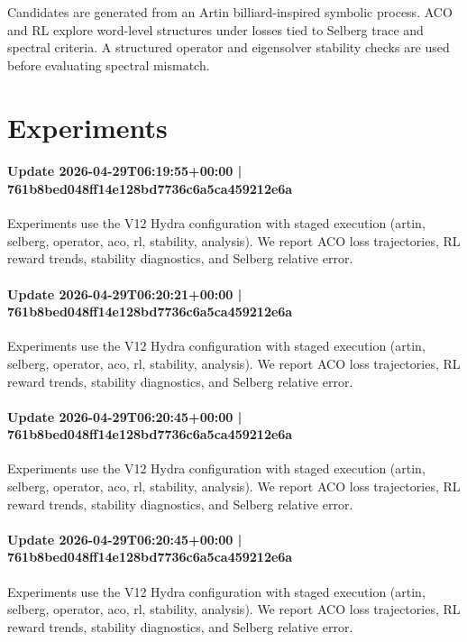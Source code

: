 \documentclass{article}
\begin{document}
Candidates are generated from an Artin billiard-inspired symbolic process. ACO and RL explore word-level structures under losses tied to Selberg trace and spectral criteria. A structured operator and eigensolver stability checks are used before evaluating spectral mismatch.

\section{Experiments}
\paragraph{Update 2026-04-29T06:19:55+00:00 | 761b8bed048ff14e128bd7736c6a5ca459212e6a}

Experiments use the V12 Hydra configuration with staged execution (artin, selberg, operator, aco, rl, stability, analysis). We report ACO loss trajectories, RL reward trends, stability diagnostics, and Selberg relative error.

\paragraph{Update 2026-04-29T06:20:21+00:00 | 761b8bed048ff14e128bd7736c6a5ca459212e6a}

Experiments use the V12 Hydra configuration with staged execution (artin, selberg, operator, aco, rl, stability, analysis). We report ACO loss trajectories, RL reward trends, stability diagnostics, and Selberg relative error.

\paragraph{Update 2026-04-29T06:20:45+00:00 | 761b8bed048ff14e128bd7736c6a5ca459212e6a}

Experiments use the V12 Hydra configuration with staged execution (artin, selberg, operator, aco, rl, stability, analysis). We report ACO loss trajectories, RL reward trends, stability diagnostics, and Selberg relative error.

\paragraph{Update 2026-04-29T06:20:45+00:00 | 761b8bed048ff14e128bd7736c6a5ca459212e6a}

Experiments use the V12 Hydra configuration with staged execution (artin, selberg, operator, aco, rl, stability, analysis). We report ACO loss trajectories, RL reward trends, stability diagnostics, and Selberg relative error.
\end{document}
